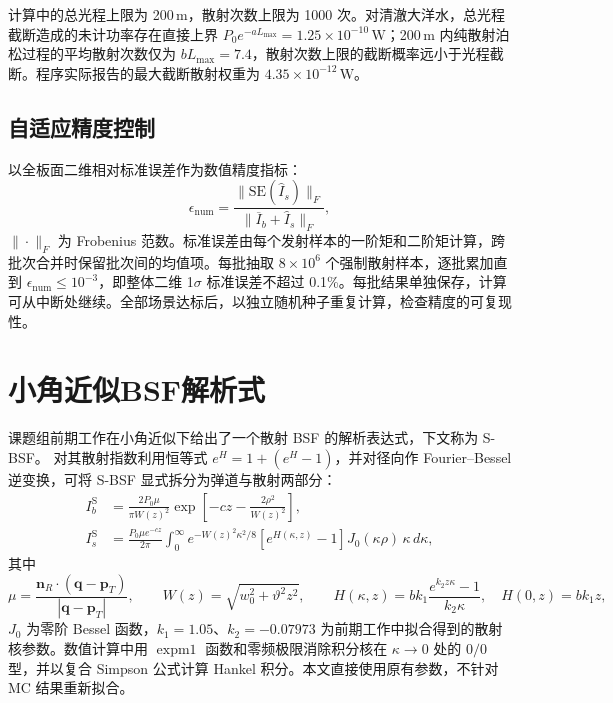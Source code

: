 计算中的总光程上限为 200\,m，散射次数上限为 1000 次。对清澈大洋水，总光程截断造成的未计功率存在直接上界 $P_0e^{-aL_{\max}}=1.25\times10^{-10}\,\mathrm W$；200\,m 内纯散射泊松过程的平均散射次数仅为 $bL_{\max}=7.4$，散射次数上限的截断概率远小于光程截断。程序实际报告的最大截断散射权重为 $4.35\times10^{-12}\,\mathrm W$。

\subsection{自适应精度控制}

以全板面二维相对标准误差作为数值精度指标：
\begin{equation}
\epsilon_{\mathrm{num}}=\frac{\|\mathrm{SE}(\widehat I_s)\|_F}{\|\overline I_b+\widehat I_s\|_F},
\label{eq:c4_se}
\end{equation}
$\|\cdot\|_F$ 为 Frobenius 范数。标准误差由每个发射样本的一阶矩和二阶矩计算，跨批次合并时保留批次间的均值项。每批抽取 $8\times10^6$ 个强制散射样本，逐批累加直到 $\epsilon_{\mathrm{num}}\le10^{-3}$，即整体二维 1$\sigma$ 标准误差不超过 0.1\%。每批结果单独保存，计算可从中断处继续。全部场景达标后，以独立随机种子重复计算，检查精度的可复现性。

\section{小角近似BSF解析式}
\label{sec:c4_sbsf}

课题组前期工作在小角近似下给出了一个散射 BSF 的解析表达式，下文称为 S-BSF。
对其散射指数利用恒等式 $e^H=1+(e^H-1)$，并对径向作 Fourier--Bessel 逆变换，可将 S-BSF 显式拆分为弹道与散射两部分：
\begin{align}
I_b^{\mathrm{S}}&=\frac{2P_0\mu}{\pi W(z)^2}\exp\!\left[-cz-\frac{2\rho^2}{W(z)^2}\right],\label{eq:c4_sbsf_b}\\
I_s^{\mathrm{S}}&=\frac{P_0\mu e^{-cz}}{2\pi}\int_0^\infty e^{-W(z)^2\kappa^2/8}\left[e^{H(\kappa,z)}-1\right]J_0(\kappa\rho)\,\kappa\,d\kappa,\label{eq:c4_sbsf_s}
\end{align}
其中
\begin{equation}
\mu=\frac{\mathbf n_R\cdot(\mathbf q-\mathbf p_T)}{|\mathbf q-\mathbf p_T|},\qquad
W(z)=\sqrt{w_0^2+\vartheta^2z^2},\qquad
H(\kappa,z)=bk_1\frac{e^{k_2z\kappa}-1}{k_2\kappa},\quad H(0,z)=bk_1z,
\label{eq:c4_sbsf_par}
\end{equation}
$J_0$ 为零阶 Bessel 函数，$k_1=1.05$、$k_2=-0.07973$ 为前期工作中拟合得到的散射核参数。数值计算中用 $\operatorname{expm1}$ 函数和零频极限消除积分核在 $\kappa\to0$ 处的 $0/0$ 型，并以复合 Simpson 公式计算 Hankel 积分。本文直接使用原有参数，不针对 MC 结果重新拟合。

